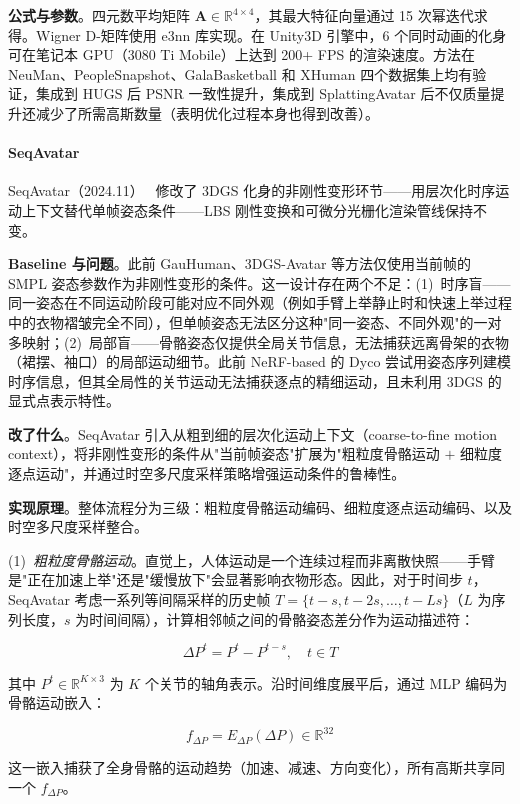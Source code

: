 \textbf{公式与参数}。四元数平均矩阵 $\mathbf{A} \in \mathbb{R}^{4 \times 4}$，其最大特征向量通过 15 次幂迭代求得。Wigner D-矩阵使用 e3nn 库实现。在 Unity3D 引擎中，6 个同时动画的化身可在笔记本 GPU（3080 Ti Mobile）上达到 200+ FPS 的渲染速度。方法在 NeuMan、PeopleSnapshot、GalaBasketball 和 XHuman 四个数据集上均有验证，集成到 HUGS 后 PSNR 一致性提升，集成到 SplattingAvatar 后不仅质量提升还减少了所需高斯数量（表明优化过程本身也得到改善）。

\paragraph{SeqAvatar}

SeqAvatar（2024.11）~\cite{2411_16768} 修改了 3DGS 化身的非刚性变形环节——用层次化时序运动上下文替代单帧姿态条件——LBS 刚性变换和可微分光栅化渲染管线保持不变。

\textbf{Baseline 与问题}。此前 GauHuman、3DGS-Avatar 等方法仅使用当前帧的 SMPL 姿态参数作为非刚性变形的条件。这一设计存在两个不足：(1)~时序盲——同一姿态在不同运动阶段可能对应不同外观（例如手臂上举静止时和快速上举过程中的衣物褶皱完全不同），但单帧姿态无法区分这种"同一姿态、不同外观"的一对多映射；(2)~局部盲——骨骼姿态仅提供全局关节信息，无法捕获远离骨架的衣物（裙摆、袖口）的局部运动细节。此前 NeRF-based 的 Dyco 尝试用姿态序列建模时序信息，但其全局性的关节运动无法捕获逐点的精细运动，且未利用 3DGS 的显式点表示特性。

\textbf{改了什么}。SeqAvatar 引入从粗到细的层次化运动上下文（coarse-to-fine motion context），将非刚性变形的条件从"当前帧姿态"扩展为"粗粒度骨骼运动 $+$ 细粒度逐点运动"，并通过时空多尺度采样策略增强运动条件的鲁棒性。

\textbf{实现原理}。整体流程分为三级：粗粒度骨骼运动编码、细粒度逐点运动编码、以及时空多尺度采样整合。

(1)~\textit{粗粒度骨骼运动}。直觉上，人体运动是一个连续过程而非离散快照——手臂是"正在加速上举"还是"缓慢放下"会显著影响衣物形态。因此，对于时间步 $t$，SeqAvatar 考虑一系列等间隔采样的历史帧 $T = \{t-s, t-2s, \ldots, t-Ls\}$（$L$ 为序列长度，$s$ 为时间间隔），计算相邻帧之间的骨骼姿态差分作为运动描述符：

\[
\Delta P^t = P^t - P^{t-s}, \quad t \in T
\]

其中 $P^t \in \mathbb{R}^{K \times 3}$ 为 $K$ 个关节的轴角表示。沿时间维度展平后，通过 MLP 编码为骨骼运动嵌入：

\[
f_{\Delta P} = E_{\Delta P}(\Delta P) \in \mathbb{R}^{32}
\]

这一嵌入捕获了全身骨骼的运动趋势（加速、减速、方向变化），所有高斯共享同一个 $f_{\Delta P}$。


